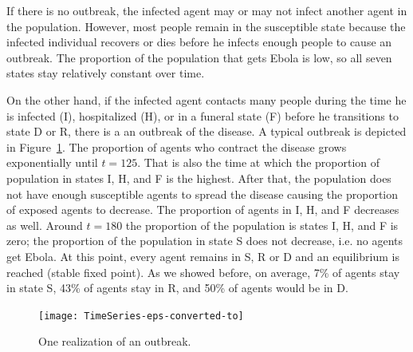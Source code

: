 
If there is no outbreak, the infected agent may or may not infect another agent in the population. However, most people remain in the  susceptible state because the infected individual recovers or dies before he infects enough people to cause an outbreak. The proportion of the population that gets Ebola is low, so all seven states stay relatively constant over time. %


On the other hand, if the infected agent contacts many people during the time he is infected (I), hospitalized (H), or in a funeral state (F) before he transitions to state D or R, there is a an outbreak of the disease. A typical outbreak is depicted in Figure~\ref{fig:Outbreak}. The proportion of agents who contract the disease grows exponentially until $t = 125$. That is also the time at which the proportion of population  in states I, H, and F is the highest. After that, the population does not have enough susceptible agents to spread the disease causing the proportion of exposed agents to decrease. The proportion of agents in I, H, and F decreases as well. Around $t = 180$ the proportion of the population is states I, H, and F is zero; the proportion of the population in state S does not decrease, i.e. no agents get Ebola. At this point, every agent remains in S, R or D and an equilibrium is reached (stable fixed point). As we showed before, on average, 7\% of agents stay in state S, 43\% of agents stay in R, and 50\% of agents would be in D. %
\begin{figure}[h!]
\begin{center}
\texttt{[image: TimeSeries-eps-converted-to]}
\end{center}
\caption{One realization of an outbreak.}
\label{fig:Outbreak}
\end{figure}

